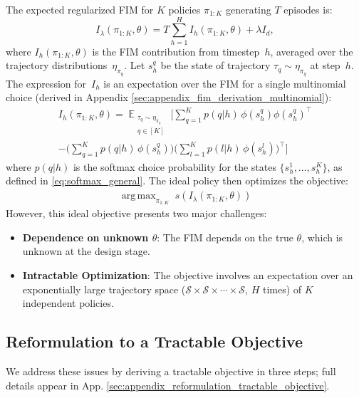 \documentclass{article}
\DeclareMathOperator*{\E}{\mathbb{E}} %
\DeclareMathOperator*{\argmax}{arg\,max}
\newcommand{\mS}{\mathcal{S}}
\begin{document}
The expected regularized FIM for $K$ policies $\pi_{1:K}$ generating $T$ episodes is:
\begin{equation}
I_\lambda(\pi_{1:K}, \theta) = T \sum_{h=1}^H I_h(\pi_{1:K}, \theta) + \lambda I_d, \label{eq:expected_fim_main}
\end{equation}
where $I_h(\pi_{1:K}, \theta)$ is the FIM contribution from timestep~$h$, averaged over the trajectory distributions~$\eta_{\pi_q}$. Let $s^q_h$ be the state of trajectory $\tau_q \sim \eta_{\pi_q}$ at step~$h$. The expression for~$I_h$ is an expectation over the FIM for a single multinomial choice (derived in Appendix \ref{sec:appendix_fim_derivation_multinomial}):
\begin{multline}
\label{eq:I_h_main}
I_h(\pi_{1:K}, \theta) = \E_{\substack{\tau_q \sim \eta_{\pi_q} \\ q \in [K]}} \!\Bigg[
\sum_{q=1}^K p(q|h)\,\phi(s^q_{h})\phi(s^q_{h})^\top \\
- \Big(\sum_{q=1}^K p(q|h)\,\phi(s^q_{h})\Big)\!\Big(\sum_{l=1}^K p(l|h)\,\phi(s^{l}_{h})\Big)^{\!\top}
\Bigg]
\end{multline}
where $p(q|h)$ is the softmax choice probability for the states $\{s^1_h, \dots, s^K_h\}$, as defined in \eqref{eq:softmax_general}. The ideal policy then optimizes the objective: 
\begin{equation}
\begin{aligned}
\argmax_{\pi_{1:K}} \; s\!\left( I_{\lambda}(\pi_{1:K}, \theta) \right)
\end{aligned}
\end{equation}
However, this ideal objective presents two major challenges:
\begin{itemize}
    \item \textbf{Dependence on unknown $\theta$}: The FIM depends on the true $\theta$, which is unknown at the design stage.
    \item \textbf{Intractable Optimization}: The objective involves an expectation over an exponentially large trajectory space ($\mS {\times} \mS {\times} \cdots {\times} \mS$, $H$ times) of $K$ independent policies.
\end{itemize}

\vspace{-0.2cm}\subsection{Reformulation to a Tractable Objective}
\label{sec:objective}
\vspace{-0.2cm}We address these issues by deriving a tractable objective in three steps; full details appear in App. \ref{sec:appendix_reformulation_tractable_objective}.
\end{document}

